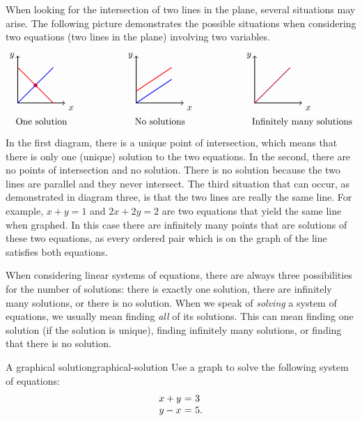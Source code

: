 When looking for the intersection of two lines in the plane, several
situations may arise. The following picture demonstrates the possible
situations when considering two equations (two lines in the plane)
involving two variables.
\begin{equation*}
  \begin{tikzpicture}[scale=0.9]
    \draw[thick, <->](0,2)--(0,0)--(2,0);
    \draw[thick, red](0,1.5)--(1.5,0);
    \draw[thick, blue](0,0)--(1.5,1.5);
    \draw[fill, purple](0.75,0.75) circle [radius=2pt];
    \node[below right] at (2,0){$x$};
    \node[left] at (0,2){$y$};
    \node[below] at (1,-0.5){One solution};

    \draw[thick, <->](5,2)--(5,0)--(7,0);
    \draw[thick, red](5,0.5)--(6.5, 1.5);
    \draw[thick, blue](5,0)--(6.5,1);
    \node[below right] at (7,0){$x$};
    \node[left] at (5,2){$y$};
    \node[below] at (6,-0.5){No solutions};

    \draw[thick, <->](10,2)--(10,0)--(12,0);
    \draw[thick, purple](10,0)--(11.5, 1.5);
    \node[below right] at (12,0){$x$};
    \node[left] at (10,2){$y$};
    \node[below] at (12,-0.5){Infinitely many solutions};
  \end{tikzpicture}
\end{equation*}
In the first diagram, there is a unique point of intersection, which
means that there is only one (unique) solution to the two equations.
In the second, there are no points of intersection and no
solution. There is no solution because the two lines are parallel and
they never intersect.  The third situation that can occur, as
demonstrated in diagram three, is that the two lines are really the
same line. For example, $x+y=1$ and $2x+2y=2$ are two equations that
yield the same line when graphed. In this case there are infinitely
many points that are solutions of these two equations, as every
ordered pair which is on the graph of the line satisfies both
equations.

When considering linear systems of equations, there are always three
possibilities for the number of solutions: there is exactly one
solution, there are infinitely many solutions, or there is no
solution.  When we speak of {\em solving} a system of equations, we
usually mean finding {\em all} of its solutions. This can mean finding
one solution (if the solution is unique), finding infinitely many
solutions, or finding that there is no solution.

\begin{example}{A graphical solution}{graphical-solution}
  Use a graph to solve the following system of equations:
  \begin{equation*}
    \begin{array}{r@{~}c@{~}l}
      x+y&=&3 \\
      y-x&=&5.
    \end{array}
  \end{equation*}
\end{example}


